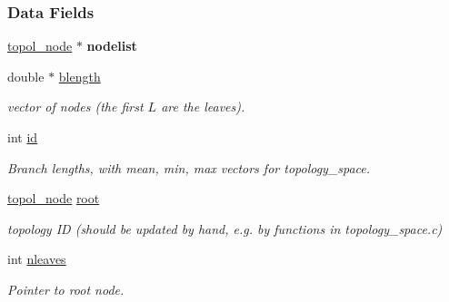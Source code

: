 \subsubsection*{Data Fields}
\begin{DoxyCompactItemize}
\item 
\mbox{\label{structtopology__struct_a352f502c9d84b575472264872ffb15f9}} 
\hyperlink{structtopol__node__struct}{topol\+\_\+node} $\ast$ {\bfseries nodelist}
\item 
\mbox{\label{structtopology__struct_acff9f1279985bba8c925f23e3e1b402f}} 
double $\ast$ \hyperlink{structtopology__struct_acff9f1279985bba8c925f23e3e1b402f}{blength}
\begin{DoxyCompactList}\small\item\em vector of nodes (the first $L$ are the leaves). \end{DoxyCompactList}\item 
\mbox{\label{structtopology__struct_a4e06620b64c11507e0970dce07de138e}} 
int \hyperlink{structtopology__struct_a4e06620b64c11507e0970dce07de138e}{id}
\begin{DoxyCompactList}\small\item\em Branch lengths, with mean, min, max vectors for topology\+\_\+space. \end{DoxyCompactList}\item 
\mbox{\label{structtopology__struct_a1b636052614bfd03729f580bed52c429}} 
\hyperlink{structtopol__node__struct}{topol\+\_\+node} \hyperlink{structtopology__struct_a1b636052614bfd03729f580bed52c429}{root}
\begin{DoxyCompactList}\small\item\em topology ID (should be updated by hand, e.\+g. by functions in topology\+\_\+space.\+c) \end{DoxyCompactList}\item 
\mbox{\label{structtopology__struct_a792c38326b5188ea14cf166b7013f05b}} 
int \hyperlink{structtopology__struct_a792c38326b5188ea14cf166b7013f05b}{nleaves}
\begin{DoxyCompactList}\small\item\em Pointer to root node. \end{DoxyCompactList}\item 

\end{DoxyCompactItemize}
